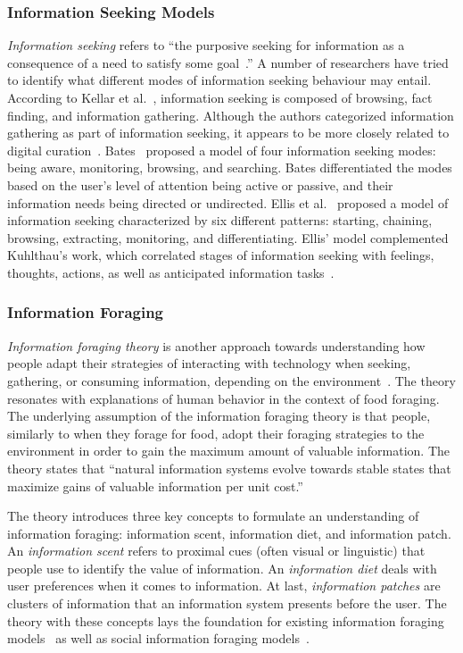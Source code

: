 \documentclass{sigchi}
\begin{document}
\subsubsection{Information Seeking Models}
\textit{Information seeking} refers to ``the purposive seeking for information as a consequence of a need to satisfy some goal~\cite{wilson2000human}.'' A number of researchers have tried to identify what different modes of information seeking behaviour may entail. According to Kellar et al.~\cite{kellar2006goal}, information seeking is composed of browsing, fact finding, and information gathering. Although the authors categorized information gathering as part of information seeking, it appears to be more closely related to digital curation~\cite{beagrie2008digital,whittaker2011personal}. Bates~\cite{bates1986exploratory,bates2002toward} proposed a model of four information seeking modes: being aware, monitoring, browsing, and searching. Bates differentiated the modes based on the user's level of attention being active or passive, and their information needs being directed or undirected. Ellis et al.~\cite{ellis1989behavioural,ellis1993comparison,ellis1997modelling} proposed a model of information seeking characterized by six different patterns: starting, chaining, browsing, extracting, monitoring, and differentiating. Ellis' model complemented Kuhlthau's work, which correlated stages of information seeking with feelings, thoughts, actions, as well as anticipated information tasks~\cite{kuhlthau1991inside}. 

\subsubsection{Information Foraging}
\textit{Information foraging theory} is another approach towards understanding how people adapt their strategies of interacting with technology when seeking, gathering, or consuming information, depending on the environment~\cite{pirolli1999information}. The theory resonates with explanations of human behavior in the context of food foraging. The underlying assumption of the information foraging theory is that people, similarly to when they forage for food, adopt their foraging strategies to the environment in order to gain the maximum amount of valuable information. The theory states that ``natural information systems evolve towards stable states that maximize gains of valuable information per unit cost.''

The theory introduces three key concepts to formulate an understanding of information foraging: information scent, information diet, and information patch. An \textit{information scent} refers to proximal cues (often visual or linguistic) that people use to identify the value of information. An \textit{information diet} deals with user preferences when it comes to information. At last, \textit{information patches} are clusters of information that an information system presents before the user. The theory with these concepts lays the foundation for existing information foraging models~\cite{fu2007snif,kitajima2000comprehension} as well as social information foraging models~\cite{pirolli2009elementary,fu2008microstructures}.  
\end{document}
